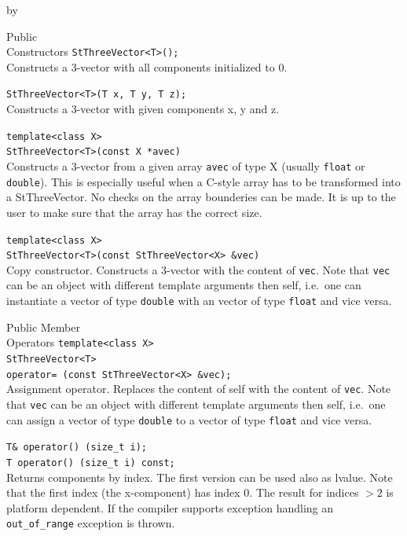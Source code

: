\documentclass[twoside]{article}
\newcommand{\comp}[1]{\texttt{#1}}%
\newcommand{\entrylabel}[1]{\mbox{\textbf{{#1}}}\hfil}%
\newenvironment{entry}
{\begin{list}{}%
    {\renewcommand{\makelabel}{\entrylabel}%
     \setlength{\labelwidth}{90pt}%
     \setlength{\leftmargin}{\labelwidth}
     \advance\leftmargin by \labelsep%
      }%
    }%
  {\end{list}}
\newcommand{\Entrylabel}[1]%
{\raisebox{0pt}[1ex][0pt]{\makebox[\labelwidth][l]%
    {\parbox[t]{\labelwidth}{\hspace{0pt}\textbf{{#1}}}}}}
\newenvironment{Entry}%
{\renewcommand{\entrylabel}{\Entrylabel}\begin{entry}}%
  {\end{entry}}
\begin{document}
\begin{description}
\begin{Entry}
\item[Public\\ Constructors]
    \verb+StThreeVector<T>();+ \\
    Constructs a 3-vector with all components initialized to 0.
    
    \verb+StThreeVector<T>(T x, T y, T z);+ \\
    Constructs a 3-vector with given components x, y and z.
    
    \verb+template<class X>+\\
    \verb+StThreeVector<T>(const X *avec)+\\
    Constructs a 3-vector from a given array \comp{avec} of type
    X (usually \comp{float} or \comp{double}).
    This is especially useful when a C-style array has to
    be transformed into a StThreeVector. 
    No checks on the array bounderies can be made.
    It is up to the user to make sure that the array
    has the correct size.
    
    \verb+template<class X>+\\
    \verb+StThreeVector<T>(const StThreeVector<X> &vec)+\\
    Copy constructor.
    Constructs a 3-vector with the content of \comp{vec}.
    Note that \comp{vec} can be an object with different
    template arguments then self, i.e.~one can instantiate
    a vector of type \comp{double} with an vector of type
    \comp{float} and vice versa.   
    
\item[Public Member\\ Operators]
    \verb+template<class X>+\\
    \verb+StThreeVector<T>+\\
    \verb+operator= (const StThreeVector<X> &vec);+ \\
    Assignment operator. Replaces the content of self with the content of \comp{vec}.
    Note that \comp{vec} can be an object with different
    template arguments then self, i.e.~one can assign
    a vector of type \comp{double} to a vector of type
    \comp{float} and vice versa.  
    
    \verb+T& operator() (size_t i);+\\
    \verb+T operator() (size_t i) const;+\\    
    Returns components by index. The first version can be used also as
    lvalue.  Note that the first index (the x-component) has index 0.
    The result for indices $> 2$ is platform dependent. If the
    compiler supports exception handling an \comp{out\_of\_range}
    exception is thrown.
    

\end{Entry}
\end{description}
\end{document}
